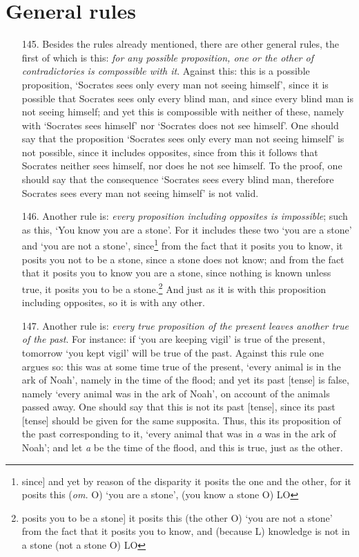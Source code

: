 \section{General rules}
\begin{itemize}
\item[145.] Besides the rules already mentioned, there are other general rules, the first of which is this: \textit{for any possible proposition, one or the other of contradictories is compossible with it}. Against this: this is a possible proposition, `Socrates sees only every man not seeing himself', since it is possible that Socrates sees only every blind man, and since every blind man is not seeing himself; and yet this is compossible with neither of these, namely with `Socrates sees himself' nor `Socrates does not see himself'. One should say that the proposition `Socrates sees only every man not seeing himself' is not possible, since it includes opposites, since from this it follows that Socrates neither sees himself, nor does he not see himself. To the proof, one should say that the consequence `Socrates sees every blind man, therefore Socrates sees every man not seeing himself' is not valid.
\item[146.] Another rule is: \textit{every proposition including opposites is impossible}; such as this, `You know you are a stone'. For it includes these two `you are a stone' and `you are not a stone', since\footnote{since] and yet by reason of the disparity it posits the one and the other, for it posits this (\textit{om.} O) `you are a stone', (you know a stone O) LO} from the fact that it posits you to know, it posits you not to be a stone, since a stone does not know; and from the fact that it posits you to know you are a stone, since nothing is known unless true, it posits you to be a stone.\footnote{posits you to be a stone] it posits this (the other O) `you are not a stone' from the fact that it posits you to know, and (because L) knowledge is not in a stone (not a stone O) LO} And just as it is with this proposition including opposites, so it is with any other.
\item[147.] Another rule is: \textit{every true proposition of the present leaves another true of the past}. For instance: if `you are keeping vigil' is true of the present, tomorrow `you kept vigil' will be true of the past. Against this rule one argues so: this was at some time true of the present, `every animal is in the ark of Noah', namely in the time of the flood; and yet its past [tense] is false, namely `every animal was in the ark of Noah', on account of the animals passed away. One should say that this is not its past [tense], since its past [tense] should be given for the same supposita. Thus, this its proposition of the past corresponding to it, `every animal that was in \textit{a} was in the ark of Noah'; and let \textit{a} be the time of the flood, and this is true, just as the other.

\end{itemize}
